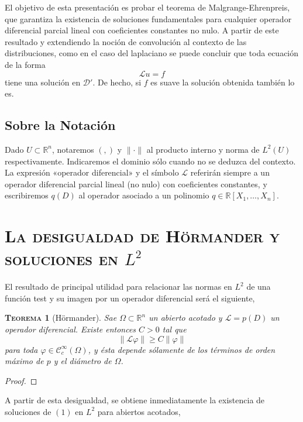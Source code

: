 \documentclass[11pt]{article}
\theoremstyle{colored}
\newtheorem{theorem}{\scshape Teorema}
\newcommand{\R}{\mathbb{R}}
\newcommand{\test}{\mathscr{D}}
\newcommand{\dist}{\test'}
\newcommand{\ip}[1]{( #1 )}
\newcommand{\guill}[1]{«#1»}
\renewcommand{\L}{\mathscr{L}}
\begin{document}
El objetivo de esta presentación es probar el teorema de Malgrange-Ehrenpreis, que garantiza la existencia de soluciones fundamentales para cualquier operador diferencial parcial lineal con coeficientes constantes no nulo. A partir de este resultado y extendiendo la noción de convolución al contexto de las distribuciones, como en el caso del laplaciano se puede concluir que toda ecuación de la forma
\[
\L u = f \tag{$1$}
\]
tiene una solución en $\dist$. De hecho, si $f$ es suave la solución obtenida también lo es. 
\subsection{Sobre la Notación}

Dado $U \subset \R^n$, notaremos $\ip{,}$ y $\|\cdot\|$ al producto interno y norma de $L^2(U)$ respectivamente. Indicaremos el dominio sólo cuando no se deduzca del contexto. La expresión \guill{operador diferencial} y el símbolo $\L$ referirán siempre a un operador diferencial parcial lineal (no nulo) con coeficientes constantes, y escribiremos $q(D)$ al operador asociado a un polinomio $q \in \R[X_1, \dots, X_n]$.

\section{\scshape La desigualdad de Hörmander y soluciones en $L^2$}

El resultado de principal utilidad para relacionar las normas en $L^2$ de una función test y su imagen por un operador diferencial será el siguiente,

\begin{theorem}[Hörmander] Sae $\Omega \subset \R^n$ un abierto acotado y $\L = p(D)$ un operador diferencial. Existe entonces $C > 0$ tal que
\[
\|\L\varphi\| \geq C\|\varphi\|
\]
para toda $\varphi \in \mathscr{C}_c^\infty(\Omega)$, y ésta depende sólamente de los términos de orden máximo de $p$ y el diámetro de $\Omega$.
\end{theorem}
\begin{proof} 
\end{proof}

A partir de esta desigualdad, se obtiene inmediatamente la existencia de soluciones de $(1)$ en $L^2$ para abiertos acotados,
\end{document}
